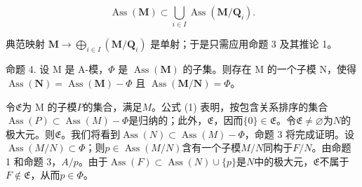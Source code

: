 \[
\operatorname{Ass} (\mathbf {M}) \subset \bigcup_ {i \in I} \operatorname{Ass} (\mathbf {M} / \mathbf {Q} _ {i}).
\]

典范映射 \(\mathbf{M} \to \bigoplus_{i \in I} (\mathbf{M} / \mathbf{Q}_i)\) 是单射；于是只需应用命题 3 及其推论 1。

命题 4. 设 M 是 A-模，\(\Phi\) 是 \(\operatorname{Ass}(\mathbf{M})\) 的子集。则存在 M 的一个子模 N，使得 \(\operatorname{Ass}(\mathbf{N}) = \operatorname{Ass}(\mathbf{M}) - \Phi\) 且 \(\operatorname{Ass}(\mathbf{M}/\mathbf{N}) = \Phi\)。

令\(\mathfrak{E}\)为 M 的子模\(P\)的集合，满足\(M\)。公式 (1) 表明，按包含关系排序的集合\(\operatorname{Ass}(P) \subset \operatorname{Ass}(M) - \Phi\)是归纳的；此外，\(\mathfrak{E}\)，因而\(\{0\} \in \mathfrak{E}\)。令\(\mathfrak{E} \neq \varnothing\)为\(N\)的极大元。则\(\mathfrak{E}\)。我们将看到\(\operatorname{Ass}(N) \subset \operatorname{Ass}(M) - \Phi\)，命题 3 将完成证明。设\(\operatorname{Ass}(M/N) \subset \Phi\)；则\(p \in \operatorname{Ass}(M/N)\)含有一个子模\(M/N\)同构于\(F/N\)。由命题 1 和命题 3，\(A/p\)。由于\(\operatorname{Ass}(F) \subset \operatorname{Ass}(N) \cup \{p\}\)是\(N\)中的极大元，\(\mathfrak{E}\)不属于\(F \notin \mathfrak{E}\)，从而\(p \in \Phi\)。

